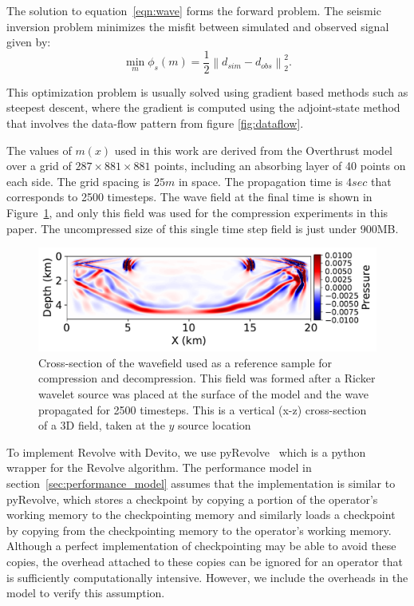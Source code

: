 \documentclass[conference]{IEEEtran}
\begin{document}
The solution to equation~\ref{eqn:wave} forms the forward problem. The seismic inversion problem minimizes the misfit between simulated and observed signal given by:
\begin{equation}
\min_{m} \phi_s(m) = \frac{1}{2} \left\lVert d_{sim} - d_{obs} \right\rVert_2^2.
\end{equation}

This optimization problem is usually solved using gradient based methods such as steepest descent,
where the gradient is computed using the adjoint-state method that involves
the data-flow pattern from figure \ref{fig:dataflow}.

The values of $m(x)$ used in this work are derived from the Overthrust
model~\cite{aminzadeh1996three} over a grid of $287 \times 881 \times 881$
points, including an absorbing layer of 40 points on each side. The grid spacing
is $25m$ in space. The propagation time is $4sec$ that corresponds to 2500 timesteps. The wave field
at the final time is shown in Figure~\ref{fig:uncompressed}, and only this field
was used for the compression experiments in this paper. The uncompressed size of
this single time step field is just under 900MB.

\begin{figure}
\begin{center}
\includegraphics[width=0.8\linewidth]{images/uncompressed.pdf}
\end{center}
\caption{Cross-section of the wavefield used as a reference sample for
  compression and decompression. This field was formed after a Ricker
  wavelet source was placed at the surface of the model and the wave propagated for 2500
  timesteps. This is a vertical (x-z) cross-section of a 3D field, taken at
  the $y$ source location}
\label{fig:uncompressed}
\end{figure}

To implement Revolve with Devito, we use pyRevolve~\cite{kukreja2018high} which
is a python wrapper for the Revolve algorithm. The performance model in
section~\ref{sec:performance_model} assumes that the implementation is similar
to pyRevolve, which stores a checkpoint by copying a portion of the operator's
working memory to the checkpointing memory and similarly loads a checkpoint by
copying from the checkpointing memory to the operator's working memory. Although
a perfect implementation of checkpointing may be able to avoid these copies, the
overhead attached to these copies can be ignored for an operator that is
sufficiently computationally intensive. However, we include the overheads in the
model to verify this assumption. 
\end{document}
